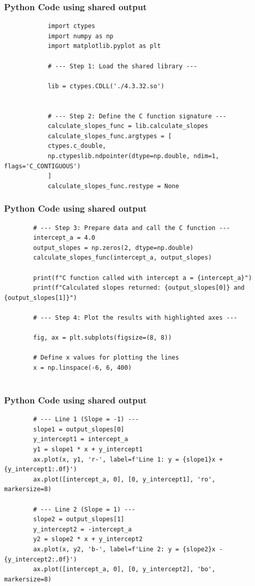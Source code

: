 \documentclass{beamer}
\begin{document}
	\begin{frame}[fragile]
		\frametitle{Python Code using shared output}
		\begin{lstlisting}
			import ctypes
			import numpy as np
			import matplotlib.pyplot as plt
			
			# --- Step 1: Load the shared library ---
			
			lib = ctypes.CDLL('./4.3.32.so')
			
			
			# --- Step 2: Define the C function signature ---
			calculate_slopes_func = lib.calculate_slopes
			calculate_slopes_func.argtypes = [
			ctypes.c_double,
			np.ctypeslib.ndpointer(dtype=np.double, ndim=1, flags='C_CONTIGUOUS')
			]
			calculate_slopes_func.restype = None
		\end{lstlisting}
	\end{frame}
	\begin{frame}[fragile]
		\frametitle{Python Code using shared output}
		\begin{lstlisting}		
		# --- Step 3: Prepare data and call the C function ---
		intercept_a = 4.0
		output_slopes = np.zeros(2, dtype=np.double)
		calculate_slopes_func(intercept_a, output_slopes)
		
		print(f"C function called with intercept a = {intercept_a}")
		print(f"Calculated slopes returned: {output_slopes[0]} and {output_slopes[1]}")
		
		# --- Step 4: Plot the results with highlighted axes ---
		
		fig, ax = plt.subplots(figsize=(8, 8))
		
		# Define x values for plotting the lines
		x = np.linspace(-6, 6, 400)
		
		\end{lstlisting}
	\end{frame}
	\begin{frame}[fragile]
		\frametitle{Python Code using shared output}
		\begin{lstlisting}
		# --- Line 1 (Slope = -1) ---
		slope1 = output_slopes[0]
		y_intercept1 = intercept_a
		y1 = slope1 * x + y_intercept1
		ax.plot(x, y1, 'r-', label=f'Line 1: y = {slope1}x + {y_intercept1:.0f}')
		ax.plot([intercept_a, 0], [0, y_intercept1], 'ro', markersize=8)
		
		# --- Line 2 (Slope = 1) ---
		slope2 = output_slopes[1]
		y_intercept2 = -intercept_a
		y2 = slope2 * x + y_intercept2
		ax.plot(x, y2, 'b-', label=f'Line 2: y = {slope2}x - {y_intercept2:.0f}')
		ax.plot([intercept_a, 0], [0, y_intercept2], 'bo', markersize=8)
		\end{lstlisting}
	\end{frame}
\end{document}
